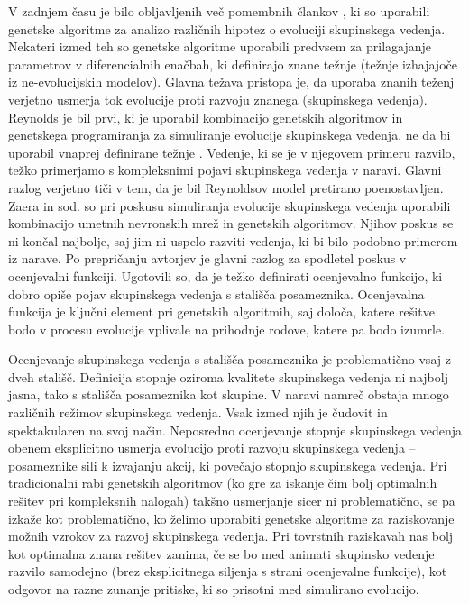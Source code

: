 \begin{razsirjeniPovzetek}
V zadnjem času je bilo obljavljenih več pomembnih člankov \cite{kunz2006prey,olson2013predator,olson2016evolution,biswas2014causes,demsar2015simulating,demsar2016balanced,demsar2017evolution,hein2015evolution}, ki so uporabili genetske algoritme za analizo različnih hipotez o evoluciji skupinskega vedenja. Nekateri izmed teh \cite{sayers2009evolved,spector2003emergence,wood2007evolving} so genetske algoritme uporabili predvsem za prilagajanje parametrov v diferencialnih enačbah, ki definirajo znane težnje (težnje izhajajoče iz ne-evolucijskih modelov). Glavna težava pristopa je, da uporaba znanih teženj verjetno usmerja tok evolucije proti razvoju znanega (skupinskega vedenja). Reynolds je bil prvi, ki je uporabil kombinacijo genetskih algoritmov in genetskega programiranja \cite{koza1992genetic} za simuliranje evolucije skupinskega vedenja, ne da bi uporabil vnaprej definirane težnje \cite{reynolds1993evolved}. Vedenje, ki se je v njegovem primeru razvilo, težko primerjamo s kompleksnimi pojavi skupinskega vedenja v naravi. Glavni razlog verjetno tiči v tem, da je bil Reynoldsov model pretirano poenostavljen. Zaera in sod. so pri poskusu simuliranja evolucije skupinskega vedenja uporabili kombinacijo umetnih nevronskih mrež in genetskih algoritmov. Njihov poskus se ni končal najbolje, saj jim ni uspelo razviti vedenja, ki bi bilo podobno primerom iz narave. Po prepričanju avtorjev je glavni razlog za spodletel poskus v ocenjevalni funkciji. Ugotovili so, da je težko definirati ocenjevalno funkcijo, ki dobro opiše pojav skupinskega vedenja s stališča posameznika. Ocenjevalna funkcija je ključni element pri genetskih algoritmih, saj določa, katere rešitve bodo v procesu evolucije vplivale na prihodnje rodove, katere pa bodo izumrle.

Ocenjevanje skupinskega vedenja s stališča posameznika je problematično vsaj z dveh stališč. Definicija stopnje oziroma kvalitete skupinskega vedenja ni najbolj jasna, tako s stališča posameznika kot skupine. V naravi namreč obstaja mnogo različnih režimov skupinskega vedenja. Vsak izmed njih je čudovit in spektakularen na svoj način. Neposredno ocenjevanje stopnje skupinskega vedenja obenem eksplicitno usmerja evolucijo proti razvoju skupinskega vedenja -- posameznike sili k izvajanju akcij, ki povečajo stopnjo skupinskega vedenja. Pri tradicionalni rabi genetskih algoritmov (ko gre za iskanje čim bolj optimalnih rešitev pri kompleksnih nalogah) takšno usmerjanje sicer ni problematično, se pa izkaže kot problematično, ko želimo uporabiti genetske algoritme za raziskovanje možnih vzrokov za razvoj skupinskega vedenja. Pri tovrstnih raziskavah nas bolj kot optimalna znana rešitev zanima, če se bo med animati skupinsko vedenje razvilo samodejno (brez eksplicitnega siljenja s strani ocenjevalne funkcije), kot odgovor na razne zunanje pritiske, ki so prisotni med simulirano evolucijo. 


\end{razsirjeniPovzetek}

